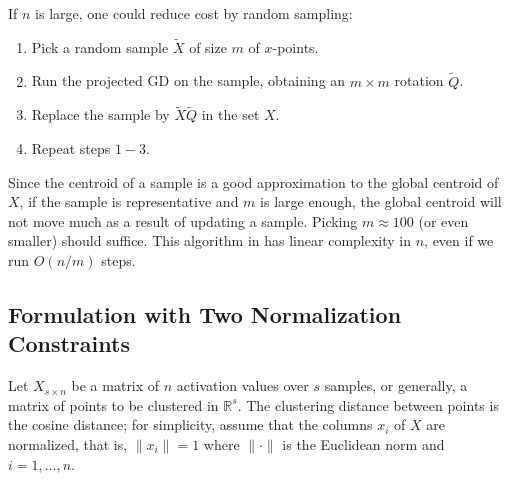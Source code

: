 \documentclass[11pt]{article}
\newcommand{\Real}{\mathbb{R}}
\begin{document}
If $n$ is large, one could reduce cost by random sampling:
\begin{enumerate}
    \item Pick a random sample $\tilde{X}$ of size $m$ of $x$-points.
    \item Run the projected GD on the sample, obtaining an $m \times m$ rotation $\tilde{Q}$.
    \item Replace the sample by $\tilde{X} \tilde{Q}$ in the set $X$.
    \item Repeat steps $1-3$.
\end{enumerate}
Since the centroid of a sample is a good approximation to the global centroid of $X$, if the sample is representative and $m$ is large enough, the global centroid will not move much as a result of updating a sample. Picking $m \approx 100$ (or even smaller) should suffice. This algorithm in has linear complexity in $n$, even if we run $O(n / m)$ steps.

\subsection{Formulation with Two Normalization Constraints}
Let $X_{s \times n}$ be a matrix of $n$ activation values over $s$ samples, or generally, a matrix of points to be clustered in $\Real^s$. The clustering distance between points is the cosine distance; for simplicity, assume that the columns $x_i$ of $X$ are normalized, that is, $\|x_i\|=1$ where $\|\cdot\|$ is the Euclidean norm and $i = 1,\dots,n$.
\end{document}
